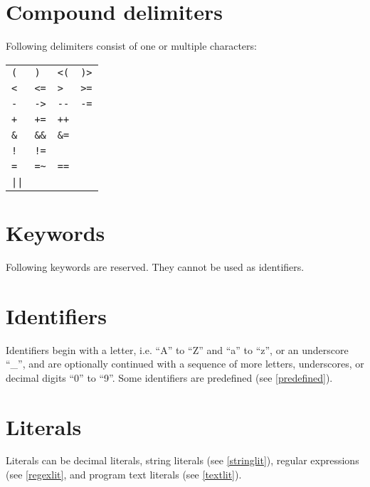\section{Compound delimiters}

Following delimiters consist of one or multiple characters:

\bigskip
\noindent
\begin{tabular}{l l l l}
   \lstinline!(! & \lstinline!)! & \lstinline!<(! & \lstinline!)>! \\
   \lstinline!<! & \lstinline!<=! & \lstinline!>! & \lstinline!>=! \\
   \lstinline!-! & \lstinline!->! & \lstinline!--! & \lstinline!-=! \\
   \lstinline!+! & \lstinline!+=! & \lstinline!++! \\
   \lstinline!&! & \lstinline!&&! & \lstinline!&=! \\
   \lstinline/!/ & \lstinline/!=/ \\
   \lstinline!=! & \lstinline!=~! & \lstinline!==! \\
   \lstinline!||! \\
\end{tabular}

\section{Keywords}

Following keywords are reserved. They cannot be used as identifiers.

\bigskip
\noindent


\section{Identifiers}\label{identifier}

Identifiers begin with a letter, i.e. ``A'' to ``Z'' and ``a'' to ``z'',
or an underscore ``\_'', and are optionally continued with a sequence
of more letters, underscores, or decimal digits ``0'' to ``9''.
Some identifiers are predefined (see \ref{predefined}).

\section{Literals}

Literals can be decimal literals, string literals (see \ref{stringlit}),
regular expressions (see \ref{regexlit}, and program text literals (see \ref{textlit}).


